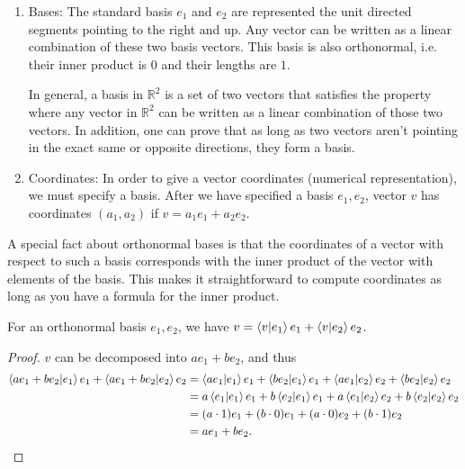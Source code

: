 \begin{enumerate}
    \item Bases: The standard basis $e_1$ and $e_2$ are represented the unit directed segments pointing to the right and up. Any vector can be written as a linear combination of these two basis vectors. This basis is also orthonormal, i.e. their inner product is $0$ and their lengths are $1$. 
    
    In general, a basis in $\mathbb R^2$ is a set of two vectors that satisfies the property where any vector in $\mathbb R^2$ can be written as a linear combination of those two vectors. In addition, one can prove that as long as two vectors aren't pointing in the exact same or opposite directions, they form a basis.
    
    \item Coordinates: In order to give a vector coordinates (numerical representation), we must specify a basis. After we have specified a basis $e_1, e_2$, vector $v$ has coordinates $(a_1, a_2)$ if $v = a_1e_1 + a_2e_2$.
\end{enumerate}

A special fact about orthonormal bases is that the coordinates of a vector with respect to such a basis corresponds with the inner product of the vector with elements of the basis. This makes it straightforward to compute coordinates as long as you have a formula for the inner product.

\begin{theorem}
    For an orthonormal basis $e_1, e_2$, we have $v = \bra{v}\ket{e_1}e_1 + \bra{v}\ket{e_2}e_2$.
\end{theorem}

\begin{proof}
    $v$ can be decomposed into $ae_1 + be_2$, and thus \begin{align*}
        \braket{ae_1 + be_2}{e_1}e_1 + \braket{ae_1 + be_2}{e_2}e_2 &= \braket{ae_1}{e_1}e_1 + \braket{be_2}{e_1}e_1 + \braket{ae_1}{e_2}e_2 + \braket{be_2}{e_2}e_2\\
        &= a\braket{e_1}{e_1}e_1 + b\braket{e_2}{e_1}e_1 + a\braket{e_1}{e_2}e_2 + b\braket{e_2}{e_2}e_2\\
        &= (a \cdot 1)e_1 + (b \cdot 0)e_1 + (a \cdot 0)e_2 + (b \cdot 1)e_2\\
        &= ae_1 + be_2.
    \end{align*}
\end{proof}